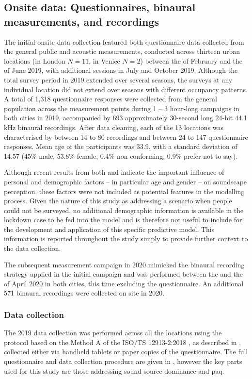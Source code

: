  \subsection{Onsite data: Questionnaires, binaural measurements, and recordings}
   The initial onsite data collection featured both questionnaire data collected from the general public and acoustic measurements, conducted across thirteen urban locations (in London $N=11$, in Venice $N=2$) between the  of February and the  of June 2019, with additional sessions in July and October 2019. Although the total survey period in 2019 extended over several seasons, the surveys at any individual location did not extend over seasons with different occupancy patterns. A total of 1,318 questionnaire responses were collected from the general population across the measurement points during 1 -- 3 hour-long campaigns in both cities in 2019, accompanied by 693 approximately 30-second long 24-bit 44.1 kHz binaural recordings. After data cleaning, each of the 13 locations was characterised by between 14 to 80 recordings and between 24 to 147 questionnaire responses. Mean age of the participants was 33.9, with a standard deviation of 14.57 (45\% male, 53.8\% female, 0.4\% non-conforming, 0.9\% prefer-not-to-say).

   Although recent results from both \citet{Tarlao2020Investigating} and \citet{Erfanian2021Psychological} indicate the important influence of personal and demographic factors -- in particular age and gender -- on soundscape perception, these factors were not included as potential features in the modelling process. Given the nature of this study as addressing a scenario when people could not be surveyed, no additional demographic information is available in the lockdown case to be fed into the model and is therefore not useful to include for the development and application of this specific predictive model. This information is reported throughout the study simply to provide further context to the data collection.

   The subsequent measurement campaign in 2020 mimicked the binaural recording strategy applied in the initial campaign and was performed between the  and the  of April 2020 in both cities, this time excluding the questionnaire. An additional 571 binaural recordings were collected on site in 2020.

   \subsubsection{Data collection}
   The 2019 data collection was performed across all the locations using the protocol based on the Method A of the ISO/TS 12913-2:2018 \citep{ISO12913Part2}, as described in \citep{Aletta2020Assessing,Mitchell2020Soundscape}, collected either via handheld tablets or paper copies of the questionnaire. The full questionnaire and data collection procedure are given in \citet{Mitchell2020Soundscape}, however the key parts used for this study are those addressing sound source dominance and \gls{paq}.

